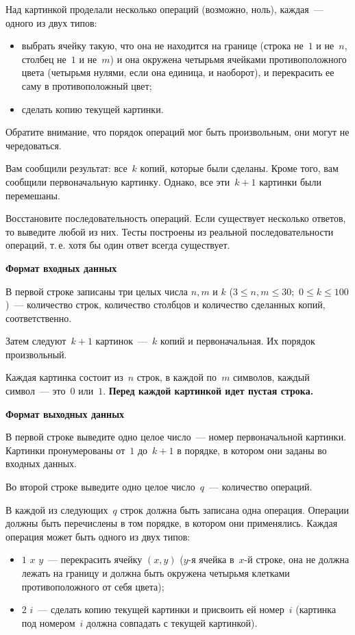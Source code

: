 \documentclass[times,specification,annotation]{style/itmo-student-thesis/itmo-student-thesis}
\begin{document}
Над картинкой проделали несколько операций (возможно, ноль), каждая~--- одного из двух типов:
\begin{itemize}[leftmargin=1.75cm]
\item выбрать ячейку такую, что она не находится на границе (строка не~$1$ и не~$n$, столбец не~$1$ и не~$m$) и она окружена четырьмя ячейками противоположного цвета (четырьмя нулями, если она единица, и наоборот), и перекрасить ее саму в противоположный цвет;
\item сделать копию текущей картинки.
\end{itemize}

Обратите внимание, что порядок операций мог быть произвольным, они могут не чередоваться.

Вам сообщили результат: все~$k$ копий, которые были сделаны. Кроме того, вам сообщили первоначальную картинку. Однако, все эти~$k+1$ картинки были перемешаны.

Восстановите последовательность операций. Если существует несколько ответов, то выведите любой из них. Тесты построены из реальной последовательности операций, т.\,е. хотя бы один ответ всегда существует.


\textbf{Формат входных данных}

В первой строке записаны три целых числа $n, m$ и $k$ ($3 \le n, m \le 30$;~$0 \le k \le 100$)~--- количество строк, количество столбцов и количество сделанных копий, соответственно.

Затем следуют~$k+1$ картинок~---~$k$ копий и первоначальная. Их порядок произвольный.

Каждая картинка состоит из~$n$ строк, в каждой по~$m$ символов, каждый символ~--- это~$0$ или~$1$. \textbf{Перед каждой картинкой идет пустая строка.}


\textbf{Формат выходных данных}

В первой строке выведите одно целое число~--- номер первоначальной картинки. Картинки пронумерованы от~$1$ до~$k+1$ в порядке, в котором они заданы во входных данных.

Во второй строке выведите одно целое число~$q$~--- количество операций.

В каждой из следующих~$q$ строк должна быть записана одна операция. Операции должны быть перечислены в том порядке, в котором они применялись. Каждая операция может быть одного из двух типов:
\begin{itemize}[leftmargin=1.75cm]
\item $1$ $x$ $y$~--- перекрасить ячейку $(x, y)$ ($y$-я ячейка в~$x$-й строке, она не должна лежать на границу и должна быть окружена четырьмя клетками противоположного от себя цвета);
\item $2$ $i$~--- сделать копию текущей картинки и присвоить ей номер~$i$ (картинка под номером~$i$ должна совпадать с текущей картинкой).
\end{itemize}
\end{document}
